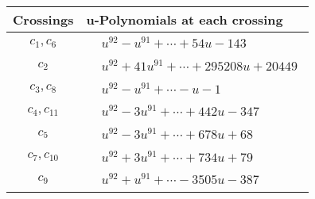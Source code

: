 \documentclass[1p]{elsarticle_modified}
\theoremstyle{definition}
\begin{document}
\begin{tabular}{m{50pt}|m{274pt}}
Crossings & \hspace{64pt}u-Polynomials at each crossing \\
\hline $$\begin{aligned}c_{1},c_{6}\end{aligned}$$&$\begin{aligned}
&u^{92}- u^{91}+\cdots+54 u-143
\end{aligned}$\\
\hline $$\begin{aligned}c_{2}\end{aligned}$$&$\begin{aligned}
&u^{92}+41 u^{91}+\cdots+295208 u+20449
\end{aligned}$\\
\hline $$\begin{aligned}c_{3},c_{8}\end{aligned}$$&$\begin{aligned}
&u^{92}- u^{91}+\cdots- u-1
\end{aligned}$\\
\hline $$\begin{aligned}c_{4},c_{11}\end{aligned}$$&$\begin{aligned}
&u^{92}-3 u^{91}+\cdots+442 u-347
\end{aligned}$\\
\hline $$\begin{aligned}c_{5}\end{aligned}$$&$\begin{aligned}
&u^{92}-3 u^{91}+\cdots+678 u+68
\end{aligned}$\\
\hline $$\begin{aligned}c_{7},c_{10}\end{aligned}$$&$\begin{aligned}
&u^{92}+3 u^{91}+\cdots+734 u+79
\end{aligned}$\\
\hline $$\begin{aligned}c_{9}\end{aligned}$$&$\begin{aligned}
&u^{92}+u^{91}+\cdots-3505 u-387
\end{aligned}$\\
\hline
\end{tabular}\\~\\
\newpage\renewcommand{\arraystretch}{1}
\end{document}
